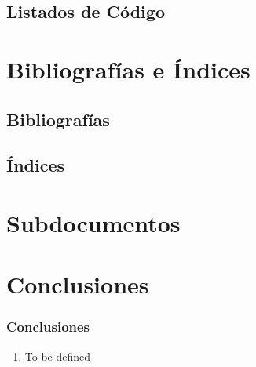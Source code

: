 \documentclass[a4paper,slidestop,xcolor=pst,dvips,blue]{beamer}
\begin{document}
\subsection{Listados de Código}

\section{Bibliografías e Índices}

\subsection{Bibliografías}

\subsection{Índices}

\section{Subdocumentos}

\section{Conclusiones}

\begin{frame}[c]
	\frametitle{Conclusiones}
	\begin{enumerate}[<+->]
		\item To be defined
	\end{enumerate}
\end{frame}
\end{document}
